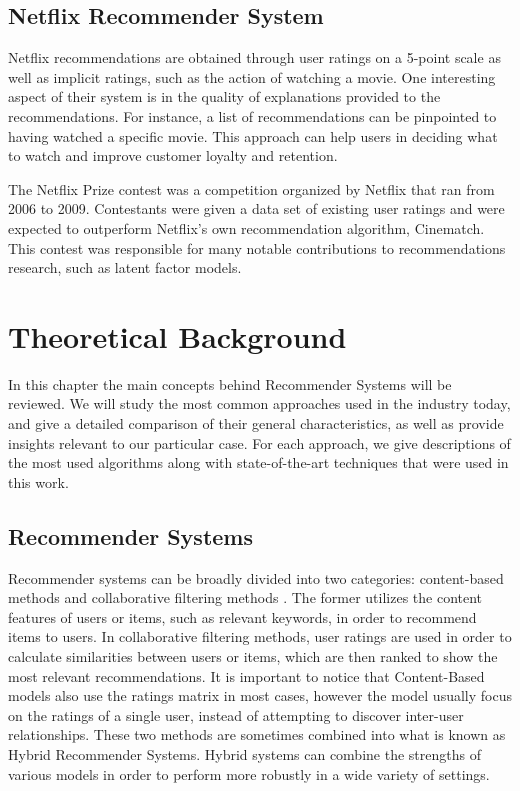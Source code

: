 \documentclass[cic,tc,english]{iiufrgs}
\begin{document}
\section{Netflix Recommender System}
Netflix recommendations are obtained through user ratings on a 5-point scale as well as implicit ratings, such as the action of watching a movie. One interesting aspect of their system is in the quality of explanations provided to the recommendations. For instance, a list of recommendations can be pinpointed to having watched a specific movie. This approach can help users in deciding what to watch and improve customer loyalty and retention.

The Netflix Prize contest was a competition organized by Netflix that ran from 2006 to 2009. Contestants were given a data set of existing user ratings and were expected to outperform Netflix's own recommendation algorithm, Cinematch. This contest was responsible for many notable contributions to recommendations research, such as latent factor models.

\chapter{Theoretical Background}
In this chapter the main concepts behind Recommender Systems will be reviewed. We will study the most common approaches used in the industry today, and give a detailed comparison of their general characteristics, as well as provide insights relevant to our particular case. For each approach, we give descriptions of the most used algorithms along with state-of-the-art techniques that were used in this work.

\section{Recommender Systems}
Recommender systems can be broadly divided into two categories: content-based methods and collaborative filtering methods \cite{Rakesh2016}.
The former utilizes the content features of users or items, such as relevant keywords, in order to recommend items to users. In collaborative filtering methods, user ratings are used in order to calculate similarities between users or items, which are then ranked to show the most relevant recommendations. It is important to notice that Content-Based models also use the ratings matrix in most cases, however the model usually focus on the ratings of a single user, instead of attempting to discover inter-user relationships. These two methods are sometimes combined into what is known as Hybrid Recommender Systems. Hybrid systems can combine the strengths of various models in order to perform more robustly in a wide variety of settings.
\end{document}
